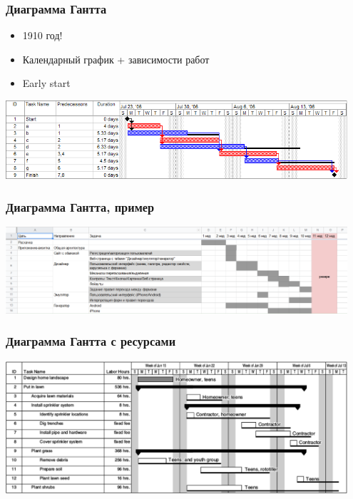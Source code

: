 \documentclass{../../slides-style}
\begin{document}
    \begin{frame}
        \frametitle{Диаграмма Гантта}
        \begin{itemize}
            \item 1910 год!
            \item Календарный график + зависимости работ
            \item Early start
        \end{itemize}
        \begin{center}
            \includegraphics[width=0.95\textwidth]{ganttChart.png}
        \end{center}
    \end{frame}

    \begin{frame}
        \frametitle{Диаграмма Гантта, пример}
        \begin{center}
            \includegraphics[width=0.95\textwidth]{ganttChartExample.png}
        \end{center}
    \end{frame}

    \begin{frame}
        \frametitle{Диаграмма Гантта с ресурсами}
        \begin{center}
            \includegraphics[width=0.95\textwidth]{ganttChartWithResources.png}
        \end{center}
    \end{frame}
\end{document}
